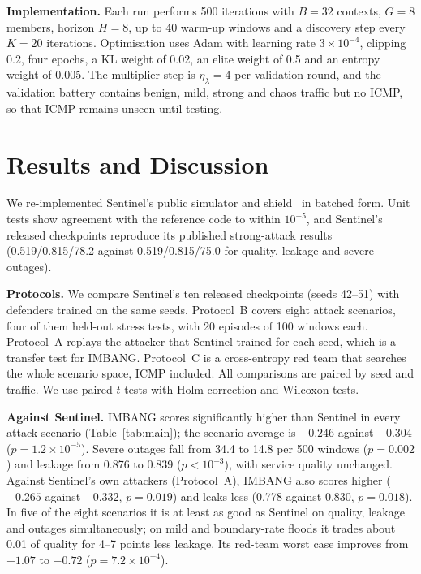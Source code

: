 \documentclass[journal]{IEEEtran}
\begin{document}
\textbf{Implementation.} Each run performs 500 iterations with $B=32$ contexts, $G=8$ members, horizon $H=8$, up to 40 warm-up windows and a discovery step every $K=20$ iterations. Optimisation uses Adam with learning rate $3\times10^{-4}$, clipping 0.2, four epochs, a KL weight of 0.02, an elite weight of 0.5 and an entropy weight of 0.005. The multiplier step is $\eta_\lambda=4$ per validation round, and the validation battery contains benign, mild, strong and chaos traffic but no ICMP, so that ICMP remains unseen until testing.

\section{Results and Discussion}
\label{sec:eval}
We re-implemented Sentinel's public simulator and shield~\cite{sentinelcode} in batched form. Unit tests show agreement with the reference code to within $10^{-5}$, and Sentinel's released checkpoints reproduce its published strong-attack results (0.519/0.815/78.2 against 0.519/0.815/75.0 for quality, leakage and severe outages).

\textbf{Protocols.} We compare Sentinel's ten released checkpoints (seeds 42--51) with defenders trained on the same seeds. Protocol~B covers eight attack scenarios, four of them held-out stress tests, with 20 episodes of 100 windows each. Protocol~A replays the attacker that Sentinel trained for each seed, which is a transfer test for IMBANG. Protocol~C is a cross-entropy red team that searches the whole scenario space, ICMP included. All comparisons are paired by seed and traffic. We use paired $t$-tests with Holm correction and Wilcoxon tests.



\textbf{Against Sentinel.} IMBANG scores significantly higher than Sentinel in every attack scenario (Table~\ref{tab:main}); the scenario average is $-0.246$ against $-0.304$ ($p=1.2\times10^{-5}$). Severe outages fall from 34.4 to 14.8 per 500 windows ($p=0.002$) and leakage from 0.876 to 0.839 ($p<10^{-3}$), with service quality unchanged. Against Sentinel's own attackers (Protocol~A), IMBANG also scores higher ($-0.265$ against $-0.332$, $p=0.019$) and leaks less (0.778 against 0.830, $p=0.018$). In five of the eight scenarios it is at least as good as Sentinel on quality, leakage and outages simultaneously; on mild and boundary-rate floods it trades about 0.01 of quality for 4--7 points less leakage. Its red-team worst case improves from $-1.07$ to $-0.72$ ($p=7.2\times10^{-4}$).
\end{document}
